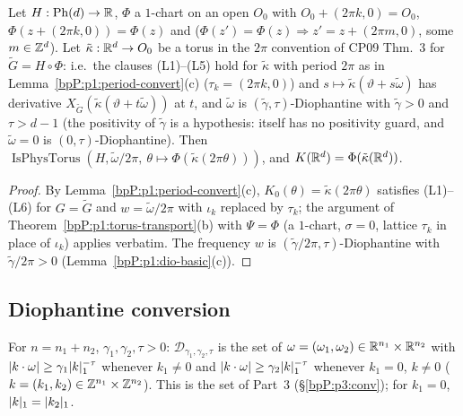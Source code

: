 \begin{corollary}\label{bpP:p1:phys-pipeline}
Let $H:\mathrm{Ph}(d)\to\mathbb{R}$, $\Phi$ a $1$-chart on an open $O_0$ with $O_0+(2\pi k,0)=O_0$, $\Phi(z+(2\pi k,0))=\Phi(z)$ and ($\Phi(z')=\Phi(z)\Rightarrow z'=z+(2\pi m,0)$, some $m\in\mathbb{Z}^d$). Let $\tilde\kappa:\mathbb{R}^d\to O_0$ be a torus in the $2\pi$ convention of CP09 Thm.~3 for $\tilde G=H\circ\Phi$: i.e.\ the clauses (L1)--(L5) hold for $\tilde\kappa$ with period $2\pi$ as in Lemma~\ref{bpP:p1:period-convert}(c) ($\tau_k=(2\pi k,0)$) and $s\mapsto\tilde\kappa(\vartheta+s\tilde\omega)$ has derivative $X_{\tilde G}(\tilde\kappa(\vartheta+t\tilde\omega))$ at $t$, and $\tilde\omega$ is $(\tilde\gamma,\tau)$-Diophantine with $\tilde\gamma>0$ and $\tau>d-1$ (the positivity of $\tilde\gamma$ is a hypothesis:  itself has no positivity guard, and $\tilde\omega=0$ is $(0,\tau)$-Diophantine). Then $\operatorname{IsPhysTorus}(H,\tilde\omega/2\pi,\ \theta\mapsto\Phi(\tilde\kappa(2\pi\theta)))$, and $K(\mathbb{R}^d)=\Phi(\tilde\kappa(\mathbb{R}^d))$.
\end{corollary}
\begin{proof}
By Lemma~\ref{bpP:p1:period-convert}(c), $K_0(\theta)=\tilde\kappa(2\pi\theta)$ satisfies (L1)--(L6) for $G=\tilde G$ and $w=\tilde\omega/2\pi$ with $\iota_k$ replaced by $\tau_k$; the argument of Theorem~\ref{bpP:p1:torus-transport}(b) with $\Psi=\Phi$ (a $1$-chart, $\sigma=0$, lattice $\tau_k$ in place of $\iota_k$) applies verbatim. The frequency $w$ is $(\tilde\gamma/2\pi,\tau)$-Diophantine with $\tilde\gamma/2\pi>0$ (Lemma~\ref{bpP:p1:dio-basic}(c)).
\end{proof}

\subsection{Diophantine conversion}\label{bpP:p1:dio}

\begin{definition}\label{bpP:p1:two-scale}
For $n=n_1+n_2$, $\gamma_1,\gamma_2,\tau>0$: $\mathcal D_{\gamma_1,\gamma_2,\tau}$ is the set of $\omega=(\omega_1,\omega_2)\in\mathbb{R}^{n_1}\times\mathbb{R}^{n_2}$ with $\lvert k\cdot\omega\rvert\ge\gamma_1\lvert k\rvert_1^{-\tau}$ whenever $k_1\ne0$ and $\lvert k\cdot\omega\rvert\ge\gamma_2\lvert k\rvert_1^{-\tau}$ whenever $k_1=0$, $k\ne0$ ($k=(k_1,k_2)\in\mathbb{Z}^{n_1}\times\mathbb{Z}^{n_2}$). This is the set of Part~3 (\S\ref{bpP:p3:conv}); for $k_1=0$, $\lvert k\rvert_1=\lvert k_2\rvert_1$.
\end{definition}

